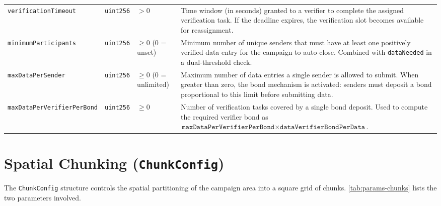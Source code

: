 \begin{table}
\begin{tabular}{p{3.8cm} l p{1.8cm} p{5.8cm}}
        \texttt{verificationTimeout}
        & \texttt{uint256}
        & $> 0$
        & Time window (in seconds) granted to a verifier to complete the assigned verification task.
        If the deadline expires, the verification slot becomes available for reassignment. \\[6pt]

        \texttt{minimumParticipants}
        & \texttt{uint256}
        & $\geq 0$ (0 = unset)
        & Minimum number of unique senders that must have at least one positively verified data entry for the campaign to auto-close.
        Combined with \texttt{dataNeeded} in a dual-threshold check. \\[6pt]

        \texttt{maxDataPerSender}
        & \texttt{uint256}
        & $\geq 0$ (0 = unlimited)
        & Maximum number of data entries a single sender is allowed to submit.
        When greater than zero, the bond mechanism is activated: senders must deposit a bond proportional to this limit before submitting data. \\[6pt]

        \texttt{maxDataPerVerifier\-PerBond}
        & \texttt{uint256}
        & $\geq 0$
        & Number of verification tasks covered by a single bond deposit.
        Used to compute the required verifier bond as $\texttt{maxDataPerVerifierPerBond} \times \texttt{dataVerifierBondPerData}$. \\
        \hline
    \end{tabular}
\end{table}


\section{Spatial Chunking (\texttt{ChunkConfig})}\label{sec:appendix-a-chunks}

The \texttt{ChunkConfig} structure controls the spatial partitioning of the campaign area into a square grid of chunks.
\cref{tab:params-chunks} lists the two parameters involved.

